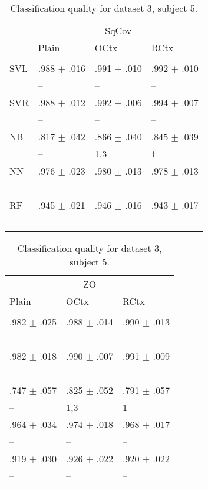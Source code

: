\begin{table}[htb]
\renewcommand{\arraystretch}{0.6}
\centering
\footnotesize
\caption{Classification quality for dataset 3, subject 5.\label{table:Set3_patient5_res}}
\begin{tabular}{llll}
 & \multicolumn{3}{c}{SqCov} \\
 & Plain & OCtx & RCtx \\
 \cmidrule(lr){2-4}\\
SVL & .988 $\pm$ .016 & .991 $\pm$ .010 & .992 $\pm$ .010 \\
 & -- & -- & -- \\
SVR & .988 $\pm$ .012 & .992 $\pm$ .006 & .994 $\pm$ .007 \\
 & -- & -- & -- \\
NB & .817 $\pm$ .042 & .866 $\pm$ .040 & .845 $\pm$ .039 \\
 & -- & {\scriptsize 1,3} & {\scriptsize 1} \\
NN & .976 $\pm$ .023 & .980 $\pm$ .013 & .978 $\pm$ .013 \\
 & -- & -- & -- \\
RF & .945 $\pm$ .021 & .946 $\pm$ .016 & .943 $\pm$ .017 \\
 & -- & -- & -- \\
\end{tabular}%
\begin{tabular}{lll}
  \multicolumn{3}{c}{ZO} \\
  Plain & OCtx & RCtx \\
  \cmidrule(lr){1-3}\\
 .982 $\pm$ .025 & .988 $\pm$ .014 & .990 $\pm$ .013 \\
  -- & -- & -- \\
 .982 $\pm$ .018 & .990 $\pm$ .007 & .991 $\pm$ .009 \\
  -- & -- & -- \\
 .747 $\pm$ .057 & .825 $\pm$ .052 & .791 $\pm$ .057 \\
  -- & {\scriptsize 1,3} & {\scriptsize 1} \\
 .964 $\pm$ .034 & .974 $\pm$ .018 & .968 $\pm$ .017 \\
  -- & -- & -- \\
 .919 $\pm$ .030 & .926 $\pm$ .022 & .920 $\pm$ .022 \\
  -- & -- & -- \\
\end{tabular}
\end{table}

